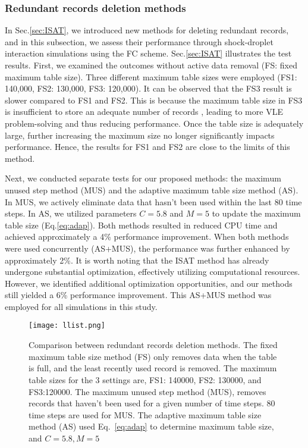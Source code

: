 \subsubsection{Redundant records deletion methods}
\label{sec:delete}
In Sec.\ref{sec:ISAT}, we introduced new methods for deleting redundant records, and in this subsection, we assess their performance through shock-droplet interaction simulations using the FC scheme. Sec.\ref{sec:ISAT} illustrates the test results. First, we examined the outcomes without active data removal (FS: fixed maximum table size). Three different maximum table sizes were employed (FS1: 140,000, FS2: 130,000, FS3: 120,000). It can be observed that the FS3 result is slower compared to FS1 and FS2. This is because the maximum table size in FS3 is insufficient to store an adequate number of records , leading to more VLE problem-solving and thus reducing performance. Once the table size is adequately large, further increasing the maximum size no longer significantly impacts performance. Hence, the results for FS1 and FS2 are close to the limits of this method.

Next, we conducted separate tests for our proposed methods: the maximum unused step method (MUS) and the adaptive maximum table size method (AS). In MUS, we actively eliminate data that hasn't been used within the last 80 time steps. In AS, we utilized parameters $C = 5.8$ and $M = 5$ to update the maximum table size (Eq.\ref{eq:adap}). Both methods resulted in reduced CPU time and achieved approximately a 4\% performance improvement. When both methods were used concurrently (AS+MUS), the performance was further enhanced by approximately 2\%. It is worth noting that the ISAT method has already undergone substantial optimization, effectively utilizing computational resources. However, we identified additional optimization opportunities, and our methods still yielded a 6\% performance improvement. This AS+MUS method was employed for all simulations in this study.


\begin{figure}[htbp]
\centering
\texttt{[image: llist.png]}
\caption{Comparison between redundant records deletion methods. The fixed maximum table size method (FS) only removes data when the table is full, and the least recently used record is removed. The maximum table sizes for the 3 settings are, FS1: 140000, FS2: 130000, and FS3:120000. The maximum unused step method (MUS), removes records that haven't been used for a given number of time steps. 80 time steps are used for MUS. The adaptive maximum table size method (AS) used Eq.~\ref{eq:adap} to determine maximum table size, and $C=5.8, M=5$}
\label{droplet_delete} 
\end{figure}

